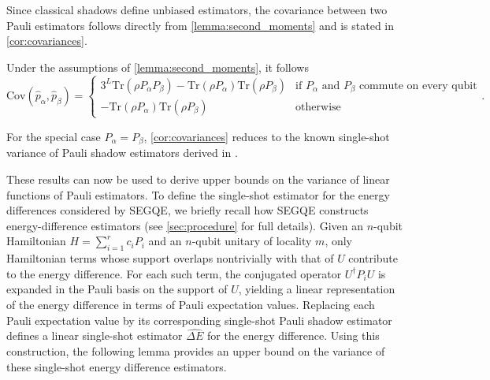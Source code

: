 Since classical shadows define unbiased estimators, the covariance between two Pauli estimators follows directly from \cref{lemma:second_moments} and is stated in \cref{cor:covariances}.

\begin{corollary}
    \label{cor:covariances}
    Under the assumptions of \cref{lemma:second_moments}, it follows
    \begin{equation}
        \mathrm{Cov}\left(\hat{p}_\alpha, \hat{p}_\beta
        \right)=\begin{cases}
        3^L\mathrm{Tr}(\rho P_\alpha P_\beta)-\mathrm{Tr}(\rho P_\alpha)\mathrm{Tr}(\rho P_\beta) & \text{if $P_\alpha$ and $P_\beta$ commute on every qubit}\\
        -\mathrm{Tr}(\rho P_\alpha)\mathrm{Tr}(\rho P_\beta) &\text{otherwise}
        \end{cases}.
    \end{equation}
\end{corollary}

For the special case $P_\alpha = P_\beta$, \cref{cor:covariances} reduces to the known single-shot variance of Pauli shadow estimators derived in \cite{huang2020predicting}. 

These results can now be used to derive upper bounds on the variance of linear functions of Pauli estimators. To define the single-shot estimator for the energy differences considered by SEGQE, we briefly recall how SEGQE constructs energy-difference estimators (see \cref{sec:procedure} for full details). Given an $n$-qubit Hamiltonian $H=\sum^r_{i=1}c_iP_i$ and an $n$-qubit unitary of locality $m$, only Hamiltonian terms whose support overlaps nontrivially with that of $U$ contribute to the energy difference. For each such term, the conjugated operator $U^\dagger P_i U$ is expanded in the Pauli basis on the support of $U$, yielding a linear representation of the energy difference in terms of Pauli expectation values. Replacing each Pauli expectation value by its corresponding single-shot Pauli shadow estimator defines a linear single-shot estimator $\hat{\Delta E}$ for the energy difference. Using this construction, the following lemma provides an upper bound on the variance of these single-shot energy difference estimators.

